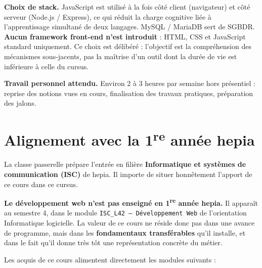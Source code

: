 \documentclass[a4paper,11pt]{article}
\begin{document}
\medskip
\noindent\textbf{Choix de stack.} JavaScript est utilisé à la fois côté client (navigateur) et côté serveur (Node.js / Express), ce qui réduit la charge cognitive liée à l'apprentissage simultané de deux langages. MySQL / MariaDB sert de SGBDR. \textbf{Aucun framework front-end n'est introduit} : HTML, CSS et JavaScript standard uniquement. Ce choix est délibéré : l'objectif est la compréhension des mécanismes sous-jacents, pas la maîtrise d'un outil dont la durée de vie est inférieure à celle du cursus.

\medskip
\noindent\textbf{Travail personnel attendu.} Environ 2 à 3 heures par semaine hors présentiel : reprise des notions vues en cours, finalisation des travaux pratiques, préparation des jalons.

\section{Alignement avec la 1\textsuperscript{re} année hepia}

La classe passerelle prépare l'entrée en filière \textbf{Informatique et systèmes de communication (ISC)} de hepia. Il importe de situer honnêtement l'apport de ce cours dans ce cursus.

\medskip
\noindent\textbf{Le développement web n'est pas enseigné en 1\textsuperscript{re} année hepia.} Il apparaît au semestre 4, dans le module \texttt{ISC\_L42 — Développement Web} de l'orientation Informatique logicielle. La valeur de ce cours ne réside donc pas dans une avance de programme, mais dans les \textbf{fondamentaux transférables} qu'il installe, et dans le fait qu'il donne très tôt une représentation concrète du métier.

\medskip
\noindent Les acquis de ce cours alimentent directement les modules suivants :
\end{document}
